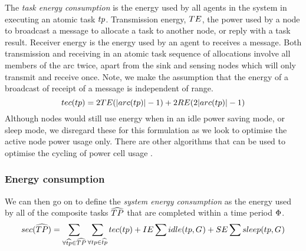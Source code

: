 \newcommand{\functionTaskEnergyConsumption}[2]{
	\functionSignature{tec}
	{\varAtomicTask{}{}}
}
The \textit{task energy consumption} is the energy used by all agents in the system in executing an atomic task $\varAtomicTask{}{}$. Transmission energy, $TE$, the power used by a node to  broadcast a message to allocate a task to another node, or reply with a task result. Receiver energy is the energy used by an agent to receives a message. Both transmission and receiving in an atomic task sequence of allocations involve all members of the arc twice, apart from the sink and sensing nodes which will only transmit and receive once. Note, we make the assumption that the energy of a broadcast of receipt of a message is independent of range. 
\begin{equation}
	\functionTaskEnergyConsumption{}{} 
	= 2\varTransmissionEnergy{}{} (\funcSize{\functionTaskArc{}{}}{} - 1)
	+ 2\varReceiverEnergy{}{} (2 \funcSize{\functionTaskArc{}{}}{} - 1)
\end{equation}
Although nodes would still use energy when in an idle power saving mode, or sleep mode, we disregard these for this formulation as we look to optimise the active node power usage only. There are other algorithms that can be used to optimise the cycling of power cell usage \cite{DUMMY}.
\subsubsection{Energy consumption}
\newcommand{\functionSystemEnergyConsumption}[2]{
	\functionSignature{sec}
	{\setCompositeTask{}{}}
}
We can then go on to define the \textit{system energy consumption} as the energy used by all of the composite tasks $\setCompositeTask{}{}$ that are completed within a time period $\Phi$.
\begin{equation}
	\functionSystemEnergyConsumption{}{} 
	= 
	\sum_{\forall \varCompositeTask{}{} \in \setCompositeTask{}{}}
	\sum_{\forall \varAtomicTask{}{} \in \varCompositeTask{}{}} \functionTaskEnergyConsumption{}{}
	+ \varIdleEnergy{}{} \sum \functionIdleRole{}{}
	+ \varSleepEnergy{}{} \sum \functionSleepRole{}{}
\end{equation}


